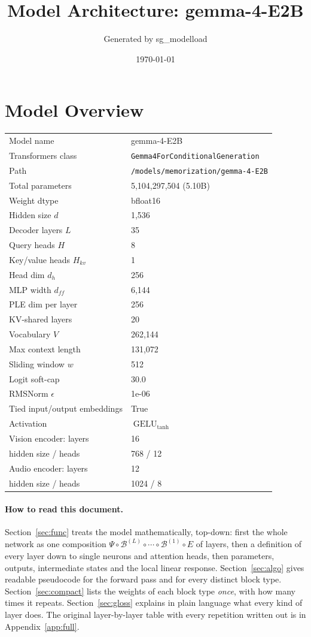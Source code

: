 \documentclass[10pt,a4paper]{article}
\title{Model Architecture: gemma-4-E2B}
\author{Generated by sg\_modelload}
\date{\today}
\newcommand{\op}[1]{\operatorname{#1}}
\theoremstyle{definition}
\begin{document}
\maketitle
\tableofcontents
\clearpage
\section{Model Overview}
\begin{tabular}{ll}
\toprule
Model name & gemma-4-E2B \\
Transformers class & \texttt{Gemma4ForConditionalGeneration} \\
Path & \texttt{/models/memorization/gemma-4-E2B} \\
Total parameters & 5,104,297,504 (5.10B) \\
Weight dtype & bfloat16 \\
\midrule
Hidden size $d$ & 1,536 \\
Decoder layers $L$ & 35 \\
Query heads $H$ & 8 \\
Key/value heads $H_{kv}$ & 1 \\
Head dim $d_h$ & 256 \\
MLP width $d_{ff}$ & 6,144 \\
PLE dim per layer & 256 \\
KV-shared layers & 20 \\
Vocabulary $V$ & 262,144 \\
Max context length & 131,072 \\
Sliding window $w$ & 512 \\
Logit soft-cap & 30.0 \\
RMSNorm $\epsilon$ & 1e-06 \\
Tied input/output embeddings & True \\
Activation & $\op{GELU}_{\tanh}$ \\
\midrule
Vision encoder: layers & 16 \\
\quad hidden size / heads & 768 / 12 \\
\midrule
Audio encoder: layers & 12 \\
\quad hidden size / heads & 1024 / 8 \\
\bottomrule
\end{tabular}

\paragraph{How to read this document.} Section~\ref{sec:func} treats the model mathematically, top-down: first the whole network as one composition $\Psi\circ\mathcal{B}^{(L)}\circ\cdots\circ\mathcal{B}^{(1)}\circ E$ of layers, then a definition of every layer down to single neurons and attention heads, then parameters, outputs, intermediate states and the local linear response. Section~\ref{sec:algo} gives readable pseudocode for the forward pass and for every distinct block type. Section~\ref{sec:compact} lists the weights of each block type \emph{once}, with how many times it repeats. Section~\ref{sec:gloss} explains in plain language what every kind of layer does. The original layer-by-layer table with every repetition written out is in Appendix~\ref{app:full}.
\end{document}
